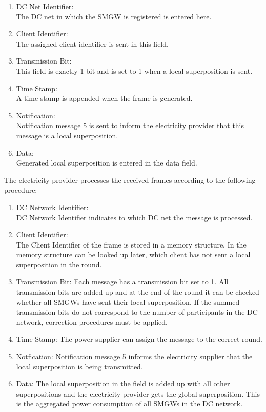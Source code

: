 \begin{enumerate}
\item DC Net Identifier:\\
The DC net in which the SMGW is registered is entered here.
\item Client Identifier:\\ 
The assigned client identifier is sent in this field.
\item Transmission Bit:\\
This field is exactly 1 bit and is set to 1 when a local superposition is sent.
\item Time Stamp:\\
A time stamp is appended when the frame is generated.
\item Notification:\\
Notification message 5 is sent to inform the electricity provider that this message is a local superposition.
\item Data:\\
Generated local superposition is entered in the data field.
\end{enumerate}
The electricity provider processes the received frames according to the following procedure:\\
\begin{enumerate}
\item DC Network Identifier:\\
DC Network Identifier indicates to which DC net the message is processed.
\item Client Identifier:\\
The Client Identifier of the frame is stored in a memory structure. In the memory structure can be looked up later, which client has not sent a local superposition in the round.
\item Transmission Bit: Each message has a transmission bit set to 1. All transmission bits are added up and at the end of the round it can be checked whether all SMGWs have sent their local superposition. If the summed transmission bits do not correspond to the number of participants in the DC network, correction procedures must be applied.
\item Time Stamp: The power supplier can assign the message to the correct round.
\item Notfication: Notification message 5 informs the electricity supplier that the local superposition is being transmitted.
\item Data:
The local superposition in the field is added up with all other superpositions and the electricity provider gets the global superposition. This is the aggregated power consumption of all SMGWs in the DC network.
\end{enumerate}
